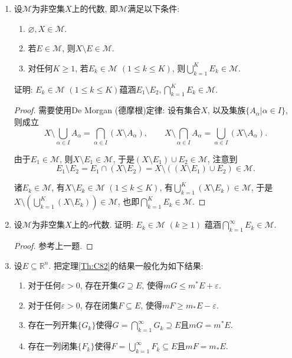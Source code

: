 \begin{quiza}
\begin{enumerate}
\item 设\(\mathscr{M}\)为非空集\(X\)上的代数, 即\(\mathscr{M}\)满足以下条件:
\begin{enumerate}[label=(\roman*)]
    \item \(\varnothing,X\in\mathscr{M}\).
    \item 若\(E\in\mathscr{M}\), 则\(X\setminus E\in\mathscr{M}\).
    \item 对任何\(K\geqslant 1\), 若\(E_k\in \mathscr{M}\) \((1\leqslant k\leqslant K)\), 则\(\bigcup_{k=1}^{K}E_k\in\mathscr{M}\).
\end{enumerate}
证明: \(E_k\in\mathscr{M}\) \((1\leqslant k\leqslant K)\)蕴涵\(E_1\setminus E_2,\bigcap_{k=1}^{K}E_k\in\mathscr{M}\).
\begin{proof}
需要使用De Morgan (德摩根)定律: 设有集合\(X\), 以及集族\(\{A_{\alpha}|\alpha\in I\}\), 则成立
\[X\setminus\bigcup_{\alpha\in I}A_{\alpha}
=\bigcap_{\alpha\in I}\left(X\setminus A_{\alpha}\right),\qquad 
X\setminus\bigcap_{\alpha\in I}A_{\alpha}
=\bigcup_{\alpha\in I}\left(X\setminus A_{\alpha}\right).\]

由于\(E_1\in\mathscr{M}\), 则\(X\setminus E_1\in\mathscr{M}\), 
于是\(\left(X\setminus E_1\right)\cup E_2\in\mathscr{M}\), 注意到
\[E_1\setminus E_2=E_1\cap\left(X\setminus E_2\right)=X\setminus\left(\left(X\setminus E_1\right)\cup E_2\right)\in\mathscr{M}.\]

诸\(E_k\in\mathscr{M}\), 有\(X\setminus E_k\in \mathscr{M}\) \((1\leqslant k\leqslant K)\), 
有\(\bigcup_{k=1}^K\left(X\setminus E_k\right)\in \mathscr{M}\), 
于是\(X\setminus\left(\bigcup_{k=1}^K\left(X\setminus E_k\right)\right)\in\mathscr{M}\), 
也即\(\bigcap_{k=1}^{K}E_k\in\mathscr{M}\).
\end{proof}

\item 设\(\mathscr{M}\)为非空集\(X\)上的\(\sigma\)代数. 
证明: \(E_k\in\mathscr{M}\) \((k\geqslant 1)\)
蕴涵\(\bigcap_{k=1}^{\infty}E_k\in\mathscr{M}.\)
\begin{proof}
	参考上一题.
\end{proof}

\item 设\(E\subseteq\mathbb{R}^n\). 把定理\ref{Th:C82}的结果一般化为如下结果:
\begin{enumerate}[label=(\roman*)]
\item 对于任何\(\varepsilon>0\), 存在开集\(G\supseteq E\), 使得\(mG\leqslant m^*E+\varepsilon.\)
\item 对于任何\(\varepsilon>0\), 存在闭集\(F\subseteq E\), 使得\(mF\geqslant m_*E-\varepsilon\).
\item 存在一列开集\(\{G_k\}\)使得\(G=\bigcap_{k=1}^{\infty}G_k\supseteq E\)且\(mG=m^*E\).
\item 存在一列闭集\(\{F_k\}\)使得\(F=\bigcup_{k=1}^{\infty}F_k\subseteq E\)且\(mF=m_*E\).
\end{enumerate}


\end{enumerate}
\end{quiza}
